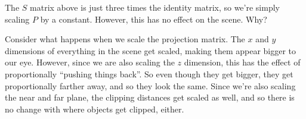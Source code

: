 \documentclass[11pt]{tingpset}
\begin{document}
    The $S$ matrix above is just three times the identity matrix, so we're simply scaling $P$ by a constant. However, this has no effect on the scene. Why?

    Consider what happens when we scale the projection matrix. The $x$ and $y$ dimensions of everything in the scene get scaled, making them appear bigger to our eye. However, since we are also scaling the $z$ dimension, this has the effect of proportionally ``pushing things back''. So even though they get bigger, they get proportionally farther away, and so they look the same. Since we're also scaling the near and far plane, the clipping distances get scaled as well, and so there is no change with where objects get clipped, either.

  \problem
  \problem

  \todo

  \problem

  \todo

  \problem

  \todo

  \problem

  \todo
\end{document}
